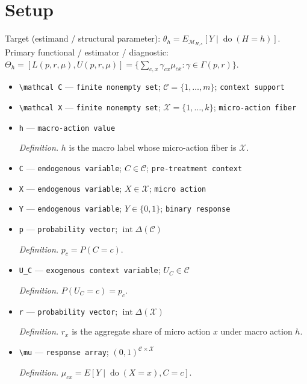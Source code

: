 \documentclass{article}
\begin{document}
\section{Setup}

Target (estimand / structural parameter): \(\theta_h=E_{\mathcal M_{H,s}}[Y\mid\operatorname{do}(H=h)]\).
Primary functional / estimator / diagnostic: \(\Theta_h=[L(p,r,\mu),U(p,r,\mu)]=\{\sum_{c,x}\gamma_{cx}\mu_{cx}:\gamma\in\Gamma(p,r)\}\).
\begin{itemize}
  \item \texttt{\textbackslash{}\allowbreak{}mathcal C} --- \texttt{finite nonempty set}; \(\mathcal C=\{1,\ldots,m\}\); \texttt{context support}
  \item \texttt{\textbackslash{}\allowbreak{}mathcal X} --- \texttt{finite nonempty set}; \(\mathcal X=\{1,\ldots,k\}\); \texttt{micro-\allowbreak{}action fiber}
  \item \texttt{h} --- \texttt{macro-\allowbreak{}action value}
  \par\smallskip\noindent\emph{Definition.} \(h\) is the macro label whose micro-action fiber is \(\mathcal X\).
  \item \texttt{C} --- \texttt{endogenous variable}; \(C\in\mathcal C\); \texttt{pre-\allowbreak{}treatment context}
  \item \texttt{X} --- \texttt{endogenous variable}; \(X\in\mathcal X\); \texttt{micro action}
  \item \texttt{Y} --- \texttt{endogenous variable}; \(Y\in\{0,1\}\); \texttt{binary response}
  \item \texttt{p} --- \texttt{probability vector}; \(\operatorname{int}\Delta(\mathcal C)\)
  \par\smallskip\noindent\emph{Definition.} \(p_c=P(C=c)\).
  \item \texttt{U\_\allowbreak{}C} --- \texttt{exogenous context variable}; \(U_C\in\mathcal C\)
  \par\smallskip\noindent\emph{Definition.} \(P(U_C=c)=p_c\).
  \item \texttt{r} --- \texttt{probability vector}; \(\operatorname{int}\Delta(\mathcal X)\)
  \par\smallskip\noindent\emph{Definition.} \(r_x\) is the aggregate share of micro action \(x\) under macro action \(h\).
  \item \texttt{\textbackslash{}\allowbreak{}mu} --- \texttt{response array}; \((0,1)^{\mathcal C\times\mathcal X}\)
  \par\smallskip\noindent\emph{Definition.} \(\mu_{cx}=E[Y\mid\operatorname{do}(X=x),C=c]\).

\end{itemize}
\end{document}
